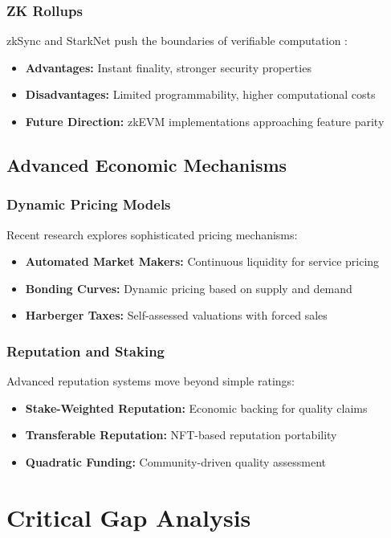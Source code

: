 \subsubsection{ZK Rollups}
zkSync and StarkNet push the boundaries of verifiable computation \citep{gluchowski2021zksync}:
\begin{itemize}
    \item \textbf{Advantages:} Instant finality, stronger security properties
    \item \textbf{Disadvantages:} Limited programmability, higher computational costs
    \item \textbf{Future Direction:} zkEVM implementations approaching feature parity
\end{itemize}

\subsection{Advanced Economic Mechanisms}

\subsubsection{Dynamic Pricing Models}
Recent research explores sophisticated pricing mechanisms:
\begin{itemize}
    \item \textbf{Automated Market Makers:} Continuous liquidity for service pricing
    \item \textbf{Bonding Curves:} Dynamic pricing based on supply and demand
    \item \textbf{Harberger Taxes:} Self-assessed valuations with forced sales
\end{itemize}

\subsubsection{Reputation and Staking}
Advanced reputation systems move beyond simple ratings:
\begin{itemize}
    \item \textbf{Stake-Weighted Reputation:} Economic backing for quality claims
    \item \textbf{Transferable Reputation:} NFT-based reputation portability
    \item \textbf{Quadratic Funding:} Community-driven quality assessment
\end{itemize}
\section{Critical Gap Analysis}

